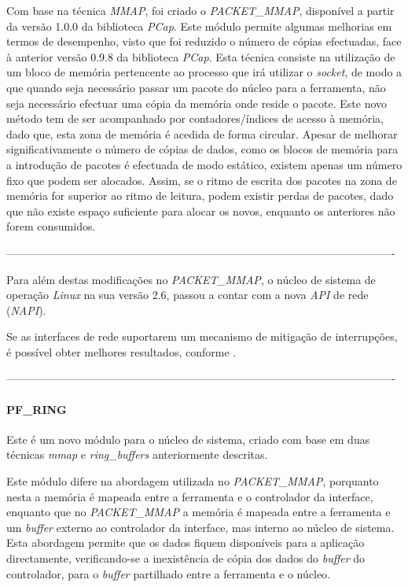 Com base na técnica \textit{MMAP}, foi criado o \textit{PACKET\_MMAP}, disponível a partir da versão 1.0.0 da biblioteca \textit{PCap}.
Este módulo permite algumas melhorias em termos de desempenho, visto que foi reduzido o número de cópias efectuadas, face à anterior versão 0.9.8 da biblioteca \textit{PCap}.
Esta técnica consiste na utilização de um bloco de memória pertencente ao processo que irá utilizar o \textit{socket}, de modo a que quando seja necessário passar um pacote do núcleo para a ferramenta, não seja necessário efectuar uma cópia da memória onde reside o pacote.
Este novo método tem de ser acompanhado por contadores/índices de acesso à memória, dado que, esta zona de memória é acedida de forma circular.
Apesar de melhorar significativamente o número de cópias de dados, como os blocos de memória para a introdução de pacotes é efectuada de modo estático, existem apenas um número fixo que podem ser alocados.
Assim, se o ritmo de escrita dos pacotes na zona de memória for superior ao ritmo de leitura, podem existir perdas de pacotes, dado que não existe espaço suficiente para alocar os novos, enquanto os anteriores não forem consumidos.

----------------------------------------------------------------------------------------------------------

Para além destas modificações no \textit{PACKET\_MMAP}, o núcleo de sistema de operação \textit{Linux} na sua versão 2.6, passou a contar com a nova \textit{API} de rede (\textit{NAPI}).

Se as interfaces de rede suportarem um mecanismo de mitigação de interrupções, é possível obter melhores resultados, conforme \cite{Deri2004}.

----------------------------------------------------------------------------------------------------------

\paragraph*{PF\_RING}

Este é um novo módulo para o núcleo de sistema, criado com base em duas técnicas \textit{mmap} e \textit{ring\_buffers} anteriormente descritas.

Este módulo difere na abordagem utilizada no \textit{PACKET\_MMAP}, porquanto nesta a memória é mapeada entre a ferramenta e o controlador da interface, enquanto que no \textit{PACKET\_MMAP} a memória é mapeada entre a ferramenta e um \textit{buffer} externo ao controlador da interface, mas interno ao núcleo de sistema.
Esta abordagem permite que os dados fiquem disponíveis para a aplicação directamente, verificando-se a inexistência de cópia dos dados do \textit{buffer} do controlador, para o \textit{buffer} partilhado entre a ferramenta e o núcleo\cite{PFRING}.
 

